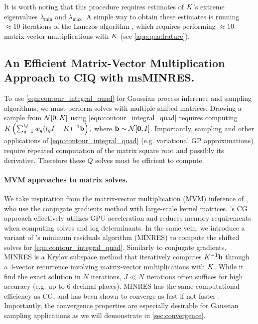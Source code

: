 It is worth noting that this procedure requires estimates of $K$'s extreme eigenvalues $\lambda_\text{min}$ and $\lambda_\text{max}$.
A simple way to obtain these estimates is running $\approx 10$ iterations of the Lanczos algorithm \cite{lanczos1950iteration,saad2003iterative,golub2012matrix}, which requires performing $\approx 10$ matrix-vector multiplications with $K$ (see \cref{app:quadrature}).




\subsection{An Efficient Matrix-Vector Multiplication Approach to CIQ with msMINRES.}
%
To use \cref{eqn:contour_integral_quad} for Gaussian process inference and sampling algorithms, we must perform solves with multiple shifted matrices.
Drawing a sample from $\normaldist{0}{\bK}$ using \cref{eqn:contour_integral_quad} requires computing
$K \left( \sum_{q=1}^Q w_q (t_q I - K )^{-1} \mathbf{b} \right),$
where $\bb \sim \normaldist{\bzero}{\bI}$.
Importantly, sampling and other applications of \cref{eqn:contour_integral_quad} (e.g. variational GP approximations)
require repeated computation of the matrix square root and possibly its derivative.
Therefore these $Q$ solves must be efficient to compute.

\paragraph{MVM approaches to matrix solves.}
We take inspiration from the matrix-vector multiplication (MVM) inference of \citet{gardner2018gpytorch}, who use the conjugate gradients method with large-scale kernel matrices.
\citeauthor{gardner2018gpytorch}'s CG approach effectively utilizes GPU acceleration and reduces memory requirements when computing solves and log determinants.
In the same vein, we introduce a variant of \citet{paige1975solution}'s minimum residuals algorithm (MINRES) to compute the shifted solves for \cref{eqn:contour_integral_quad}.
Similarly to conjugate gradients, MINRES is a Krylov subspace method that iteratively computes $K^{-1} \mathbf{b}$ through a 4-vector recurrence involving matrix-vector multiplications with $K$.
While it find the exact solution in $N$ iterations, $J \ll N$ iterations often suffices for high accuracy (e.g. up to 6 decimal places).
MINRES has the same computational efficiency as CG, and has been shown to converge as fast if not faster \cite{fong2012cg}.
Importantly, the convergence properties are especially desirable for Gaussian sampling applications as we will demonstrate in \cref{sec:convergence}.

